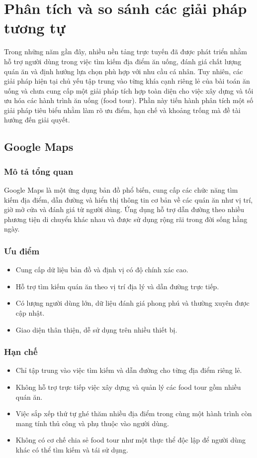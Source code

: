\section{Phân tích và so sánh các giải pháp tương tự}
Trong những năm gần đây, nhiều nền tảng trực tuyến đã được phát triển nhằm hỗ trợ người dùng
trong việc tìm kiếm địa điểm ăn uống, đánh giá chất lượng quán ăn và định hướng lựa chọn phù
hợp với nhu cầu cá nhân. Tuy nhiên, các giải pháp hiện tại chủ yếu tập trung vào từng khía cạnh
riêng lẻ của bài toán ăn uống và chưa cung cấp một giải pháp tích hợp toàn diện cho việc xây
dựng và tối ưu hóa các hành trình ăn uống (food tour). Phần này tiến hành phân tích một số giải
pháp tiêu biểu nhằm làm rõ ưu điểm, hạn chế và khoảng trống mà đề tài hướng đến giải quyết.
\subsection{Google Maps}
\subsubsection{Mô tả tổng quan}
Google Maps là một ứng dụng bản đồ phổ biến, cung cấp các chức năng tìm kiếm địa điểm, dẫn
đường và hiển thị thông tin cơ bản về các quán ăn như vị trí, giờ mở cửa và đánh giá từ người
dùng. Ứng dụng hỗ trợ dẫn đường theo nhiều phương tiện di chuyển khác nhau và được sử dụng
rộng rãi trong đời sống hằng ngày.
\subsubsection{Ưu điểm}
\begin{itemize}[label=\textbullet]
    \item Cung cấp dữ liệu bản đồ và định vị có độ chính xác cao.
    \item Hỗ trợ tìm kiếm quán ăn theo vị trí địa lý và dẫn đường trực tiếp.
    \item Có lượng người dùng lớn, dữ liệu đánh giá phong phú và thường xuyên được cập nhật.
    \item Giao diện thân thiện, dễ sử dụng trên nhiều thiết bị.
\end{itemize}
\subsubsection{Hạn chế}
\begin{itemize}[label=\textbullet]
    \item Chỉ tập trung vào việc tìm kiếm và dẫn đường cho từng địa điểm riêng lẻ.
    \item Không hỗ trợ trực tiếp việc xây dựng và quản lý các food tour gồm nhiều quán ăn.
    \item Việc sắp xếp thứ tự ghé thăm nhiều địa điểm trong cùng một hành trình còn mang tính thủ
công và phụ thuộc vào người dùng.
    \item Không có cơ chế chia sẻ food tour như một thực thể độc lập để người dùng khác có thể tìm
kiếm và tái sử dụng.
\end{itemize}

